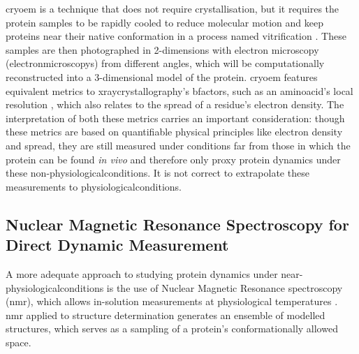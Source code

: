 \Gls{cryoem} is a technique that does not require crystallisation, but it requires the protein samples to be rapidly cooled to reduce molecular motion and keep proteins near their native \gls{conformation} in a process named vitrification \cite{naydenova_reduction_2022, pfeil-gardiner_comparative_2019, bock_effects_2022, engstrom_high-resolution_2021}. These samples are then photographed in 2-dimensions with electron \gls{microscopy} (\glspl{electronmicroscopy}) from different angles, which will be computationally reconstructed into a 3-dimensional model of the protein. \Gls{cryoem} features equivalent metrics to \gls{xraycrystallography}'s \glspl{bfactor}, such as an \gls{aminoacid}'s local resolution \cite{yip_atomic-resolution_2020}, which also relates to the spread of a residue's \gls{electron} density. The interpretation of both these metrics carries an important consideration: though these metrics are based on quantifiable physical principles like \gls{electron} density and spread, they are still measured under conditions far from those in which the protein can be found \textit{in vivo} and therefore only proxy protein \gls{dynamics} under these non-\gls{physiologicalconditions}. It is not correct to extrapolate these measurements to \gls{physiologicalconditions}.

\subsection{Nuclear Magnetic Resonance Spectroscopy for Direct Dynamic Measurement}

A more adequate approach to studying protein \gls{dynamics} under near-\gls{physiologicalconditions} is the use of Nuclear Magnetic Resonance spectroscopy (\gls{nmr}), which allows in-solution measurements at physiological temperatures \cite{kleckner_introduction_2011, kuloglu_structural_2002}. \gls{nmr} applied to structure determination generates an ensemble of modelled structures, which serves as a sampling of a protein's conformationally allowed space.

